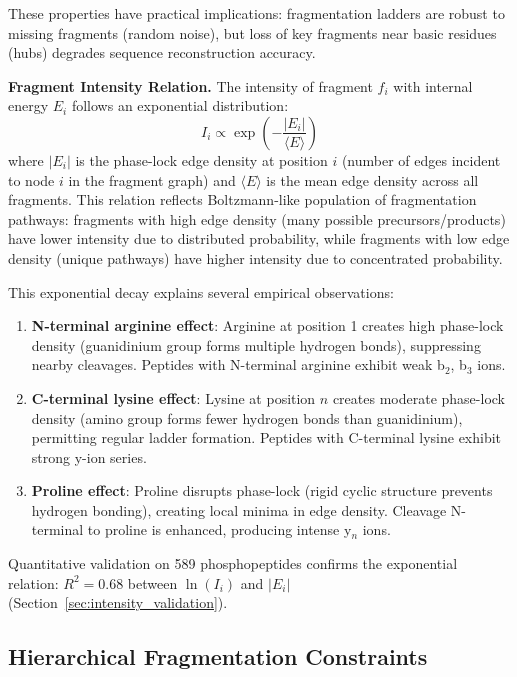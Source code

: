 \documentclass[11pt,twocolumn]{article}
\begin{document}
These properties have practical implications: fragmentation ladders are robust to missing fragments (random noise), but loss of key fragments near basic residues (hubs) degrades sequence reconstruction accuracy.

\textbf{Fragment Intensity Relation.} The intensity of fragment $f_i$ with internal energy $E_i$ follows an exponential distribution:
\begin{equation}
    I_i \propto \exp\left(-\frac{|E_i|}{\langle E \rangle}\right)
    \label{eq:intensity_relation}
\end{equation}
where $|E_i|$ is the phase-lock edge density at position $i$ (number of edges incident to node $i$ in the fragment graph) and $\langle E \rangle$ is the mean edge density across all fragments. This relation reflects Boltzmann-like population of fragmentation pathways: fragments with high edge density (many possible precursors/products) have lower intensity due to distributed probability, while fragments with low edge density (unique pathways) have higher intensity due to concentrated probability.

This exponential decay explains several empirical observations:
\begin{enumerate}[leftmargin=*]
    \item \textbf{N-terminal arginine effect}: Arginine at position 1 creates high phase-lock density (guanidinium group forms multiple hydrogen bonds), suppressing nearby cleavages. Peptides with N-terminal arginine exhibit weak b$_2$, b$_3$ ions.
    \item \textbf{C-terminal lysine effect}: Lysine at position $n$ creates moderate phase-lock density (amino group forms fewer hydrogen bonds than guanidinium), permitting regular ladder formation. Peptides with C-terminal lysine exhibit strong y-ion series.
    \item \textbf{Proline effect}: Proline disrupts phase-lock (rigid cyclic structure prevents hydrogen bonding), creating local minima in edge density. Cleavage N-terminal to proline is enhanced, producing intense y$_n$ ions.
\end{enumerate}

Quantitative validation on 589 phosphopeptides confirms the exponential relation: $R^2 = 0.68$ between $\ln(I_i)$ and $|E_i|$ (Section~\ref{sec:intensity_validation}).

\subsection{Hierarchical Fragmentation Constraints}
\label{sec:hierarchical_theory}
\end{document}
